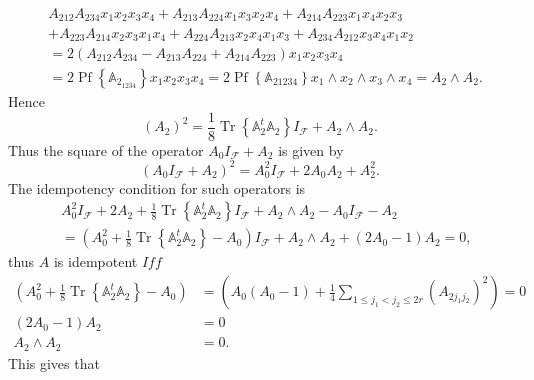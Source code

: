 \documentclass[aps, preprint]{revtex4}
\begin{document}
\begin{align} & A_{2 1 2} A_{2 3 4} x_{1} x_{2} x_{3} x_{4} +A_{2 1 3} A_{2 2 4} x_{1} x_{3} x_{2} x_{4} +A_{2 1 4} A_{2 2 3} x_{1} x_{4} x_{2} x_{3} \nonumber  \\
 &  +A_{2 2 3} A_{2 1 4} x_{2} x_{3} x_{1} x_{4} +A_{2 2 4} A_{2 1 3} x_{2} x_{4} x_{1} x_{3} +A_{2 3 4} A_{2 1 2} x_{3} x_{4} x_{1} x_{2} \nonumber  \\
 &  =2 \left (A_{2 1 2} A_{2 3 4} -A_{2 1 3} A_{2 2 4} +A_{2 1 4} A_{2 2 3}\right ) x_{1} x_{2} x_{3} x_{4} \nonumber  \\
 &  =2 \ensuremath{\operatorname*{Pf}}\left \{\mathbb{A}_{2_{1 2 3 4}}\right \} x_{1} x_{2} x_{3} x_{4} =2 \ensuremath{\operatorname*{Pf}}\left \{\mathbb{A}_{2 1 2 3 4}\right \} x_{1} \wedge x_{2} \wedge x_{3} \wedge x_{4} =A_{2} \wedge A_{2}\text{.}\end{align}Hence
\begin{equation}\left (A_{2}\right )^{2} =\frac{1}{8} \ensuremath{\operatorname*{Tr}}\left \{\mathbb{A}_{2}^{t} \mathbb{A}_{2}\right \} I_{\mathcal{F}} +A_{2} \wedge A_{2}\text{.}
\end{equation}Thus the square of the operator $A_{0} I_{\mathcal{F}} +A_{2}$ is given by
\begin{equation}\left (A_{0} I_{\mathcal{F}} +A_{2}\right )^{2} =A_{0}^{2} I_{\mathcal{F}} +2 A_{0} A_{2} +A_{2}^{2}\text{.}
\end{equation}The idempotency condition for such operators is
\begin{align} & A_{0}^{2} I_{\mathcal{F}} +2 A_{2} +\frac{1}{8} \ensuremath{\operatorname*{Tr}}\left \{\mathbb{A}_{2}^{t} \mathbb{A}_{2}\right \} I_{\mathcal{F}} +A_{2} \wedge A_{2} -A_{0} I_{\mathcal{F}} -A_{2} \nonumber  \\
 &  =\left (A_{0}^{2} +\frac{1}{8} \ensuremath{\operatorname*{Tr}}\left \{\mathbb{A}_{2}^{t} \mathbb{A}_{2}\right \} -A_{0}\right ) I_{\mathcal{F}} +A_{2} \wedge A_{2} +\left (2 A_{0} -1\right ) A_{2} =0\text{,}\end{align}thus $A$ is idempotent $I f f$
\begin{align}\left (A_{0}^{2} +\frac{1}{8} \ensuremath{\operatorname*{Tr}}\left \{\mathbb{A}_{2}^{t} \mathbb{A}_{2}\right \} -A_{0}\right ) &  =\left (A_{0} \left (A_{0} -1\right ) +\frac{1}{4} \sum _{1 \leq j_{1} <j_{2} \leq 2 r}\left (A_{2 j_{1} j_{2}}\right )^{2}\right ) =0 \\
\left (2 A_{0} -1\right ) A_{2} &  =0 \\
A_{2} \wedge A_{2} &  =0.\end{align}This gives that
\end{document}
